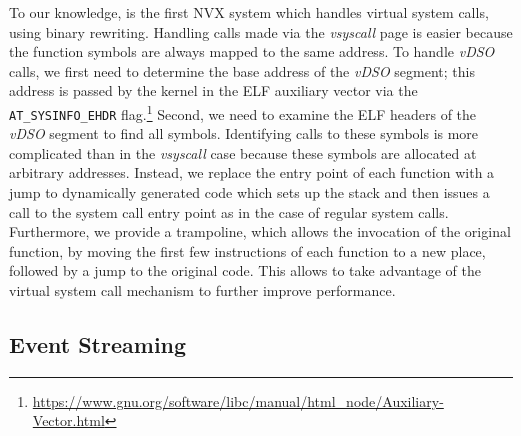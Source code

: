 To our knowledge, \varan is the first NVX system which handles virtual
system calls, using binary rewriting. 
Handling calls made via the \textit{vsyscall} page is easier because
the function symbols are always mapped to the same address.  
To handle \textit{vDSO} calls, we first need to determine the base
address of the \textit{vDSO} segment; this address is passed by the
kernel in the ELF auxiliary vector via the \lstinline`AT_SYSINFO_EHDR`
flag.\footnote{\url{https://www.gnu.org/software/libc/manual/html_node/Auxiliary-Vector.html}}
Second, we need to examine the ELF headers of the \textit{vDSO}
segment to find all symbols.  Identifying calls to these symbols is
more complicated than in the \textit{vsyscall} case because these
symbols are allocated at arbitrary addresses.  Instead, we replace the
entry point of each function with a jump to dynamically generated code
which sets up the stack and then issues a call to the \varan system
call entry point as in the case of regular system calls. Furthermore, we
provide a trampoline, which allows the invocation of the original
function, by moving the first few instructions of each function to a
new place, followed by a jump to the original code. This allows \varan
to take advantage of the virtual system call mechanism to further
improve performance.




\subsection{Event Streaming}
\label{sec:streaming}


